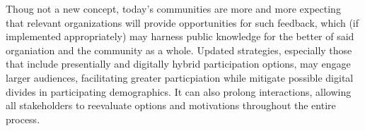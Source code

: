 Thoug not a new concept, today's communities are more and more expecting that relevant organizations will provide opportunities for such feedback, which (if implemented appropriately) may harness public knowledge for the better of said organiation and the community as a whole. %
Updated strategies, especially those that include presentially and digitally hybrid participation options, may engage larger audiences, facilitating greater particpiation while mitigate possible digital divides in participating demographics\cite{Evans-Cowley2010, Afzalan2017}. %
It can also prolong interactions, allowing all stakeholders to reevaluate options and motivations throughout the entire process\cite{Afzalan2017}. %
